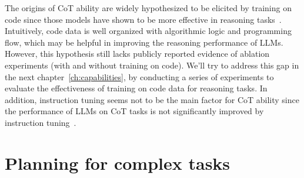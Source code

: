 The origins of CoT ability are widely hypothesized to be elicited by training on code since those models have shown to be more effective in reasoning tasks~\cite{fu2022gptroadmap, liang2022holistic}.
Intuitively, code data is well organized with algorithmic logic and programming flow, which may be helpful in improving the reasoning performance of LLMs. However, this hypothesis still lacks publicly reported evidence of ablation experiments (with and without training on code).
We'll try to address this gap in the next chapter~\ref{ch:capabilities}, by conducting a series of experiments to evaluate the effectiveness of training on code data for reasoning tasks.
In addition, instruction tuning seems not to be the main factor for CoT ability since the performance of LLMs on CoT tasks is not significantly improved by instruction tuning~\cite{chung2022scaling}.

\section{Planning for complex tasks}
\label{sec:planning}


